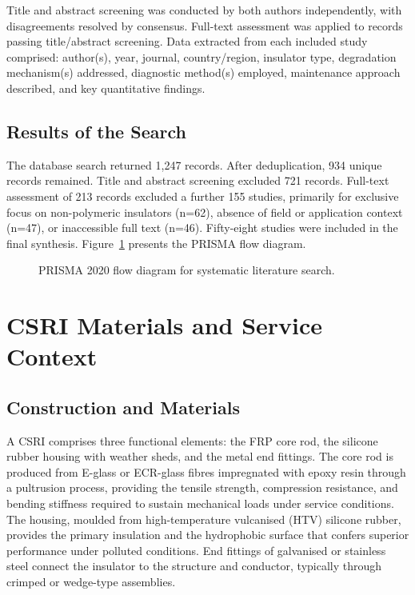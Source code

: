 \documentclass[preprint,12pt,3p]{elsarticle}
\begin{document}
Title and abstract screening was conducted by both authors independently,
with disagreements resolved by consensus. Full-text assessment was
applied to records passing title/abstract screening. Data extracted from
each included study comprised: author(s), year, journal, country/region,
insulator type, degradation mechanism(s) addressed, diagnostic method(s)
employed, maintenance approach described, and key quantitative findings.

\subsection{Results of the Search}

The database search returned 1,247 records. After deduplication, 934
unique records remained. Title and abstract screening excluded 721 records.
Full-text assessment of 213 records excluded a further 155 studies,
primarily for exclusive focus on non-polymeric insulators (n=62),
absence of field or application context (n=47), or inaccessible full text
(n=46). Fifty-eight studies were included in the final synthesis.
Figure~\ref{fig:prisma} presents the PRISMA flow diagram.

\begin{figure}[h]
  \centering
  \caption{PRISMA 2020 flow diagram for systematic literature search.}
  \label{fig:prisma}
\end{figure}


\section{CSRI Materials and Service Context}
\label{sec:csri}

\subsection{Construction and Materials}

A CSRI comprises three functional elements: the FRP core rod, the
silicone rubber housing with weather sheds, and the metal end fittings.
The core rod is produced from E-glass or ECR-glass fibres impregnated
with epoxy resin through a pultrusion process, providing the tensile
strength, compression resistance, and bending stiffness required to
sustain mechanical loads under service conditions. The housing, moulded
from high-temperature vulcanised (HTV) silicone rubber, provides the
primary insulation and the hydrophobic surface that confers superior
performance under polluted conditions. End fittings of galvanised or
stainless steel connect the insulator to the structure and conductor,
typically through crimped or wedge-type assemblies.
\end{document}
